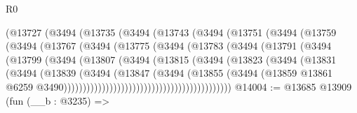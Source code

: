 \begin{lexlean}{R0}
\begin{coremodule}
                      (@13727
                        (@3494
                          (@13735
                            (@3494
                              (@13743
                                (@3494
                                  (@13751
                                    (@3494
                                      (@13759
                                        (@3494
                                          (@13767
                                            (@3494
                                              (@13775
                                                (@3494
                                                  (@13783
                                                    (@3494
                                                      (@13791
                                                        (@3494
                                                          (@13799
                                                            (@3494
                                                              (@13807
                                                                (@3494
                                                                  (@13815
                                                                    (@3494
                                                                      (@13823
                                                                        (@3494
                                                                          (@13831
                                                                            (@3494
                                                                              (@13839
                                                                                (@3494
                                                                                  (@13847
                                                                                    (@3494
                                                                                      (@13855
                                                                                        (@3494
                                                                                          (@13859
                                                                                            @13861
                                                                                            @6259
                                                                                            @3490))))))))))))))))))))))))))))))))))))))))))))
@14004 := @13685
    @13909
    (fun (__b : @3235) =>

\end{coremodule}
\end{lexlean}
